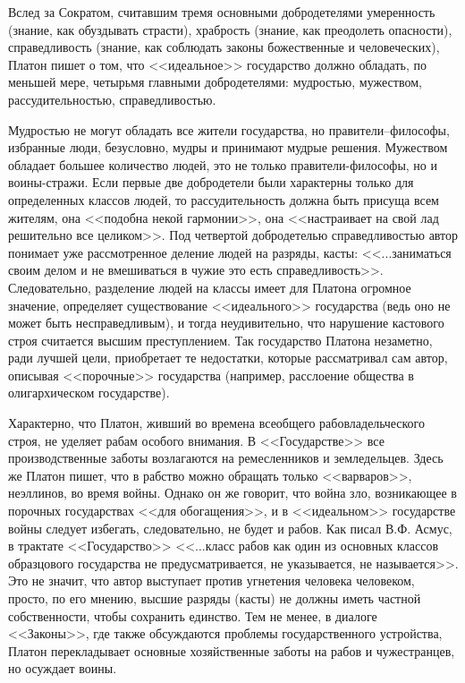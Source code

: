 	Вслед за Сократом, считавшим тремя основными добродетелями умеренность 
	(знание, как обуздывать страсти), храбрость (знание, как преодолеть 
	опасности), справедливость (знание, как соблюдать законы божественные 
	и человеческих), Платон пишет о том, что <<идеальное>> государство должно 
	обладать, по меньшей мере, четырьмя главными добродетелями: мудростью, 
	мужеством, рассудительностью, справедливостью. 

	Мудростью не могут обладать все жители государства, но правители--философы, 
	избранные люди, безусловно, мудры и принимают мудрые решения. Мужеством 
	обладает большее количество людей, это не только правители-философы, но 
	и воины-стражи. Если первые две добродетели были характерны только для 
	определенных классов людей, то рассудительность должна быть присуща всем 
	жителям, она <<подобна некой гармонии>>, она <<настраивает на свой лад решительно 
	все целиком>>. Под четвертой добродетелью справедливостью автор понимает уже 
	рассмотренное деление людей на разряды, касты: <<...заниматься своим делом и не 
	вмешиваться в чужие это есть справедливость>>. Следовательно, разделение людей 
	на классы имеет для Платона огромное значение, определяет существование 
	<<идеального>> государства (ведь оно не может быть несправедливым), и тогда 
	неудивительно, что нарушение кастового строя считается высшим 
	преступлением. Так государство Платона незаметно, ради лучшей цели, 
	приобретает те недостатки, которые рассматривал сам автор, описывая 
	<<порочные>> государства (например, расслоение общества в олигархическом 
	государстве).

	Характерно, что Платон, живший во времена всеобщего рабовладельческого 
	строя, не уделяет рабам особого внимания. В <<Государстве>> все 
	производственные заботы возлагаются на ремесленников и земледельцев. Здесь 
	же Платон пишет, что в рабство можно обращать только <<варваров>>, 
	неэллинов, во время войны. Однако он же говорит, что война зло, 
	возникающее в порочных государствах <<для обогащения>>, и в <<идеальном>> 
	государстве войны следует избегать, следовательно, не будет и рабов. 
	Как писал В.Ф. Асмус, в трактате <<Государство>> <<...класс рабов как один 
	из основных классов образцового государства не предусматривается, не 
	указывается, не называется>>. Это не значит, что автор выступает против 
	угнетения человека человеком, просто, по его мнению, высшие разряды 
	(касты) не должны иметь частной собственности, чтобы сохранить единство. 
	Тем не менее, в диалоге <<Законы>>, где также обсуждаются проблемы 
	государственного устройства, Платон перекладывает основные хозяйственные 
	заботы на рабов и чужестранцев, но осуждает воины. 

